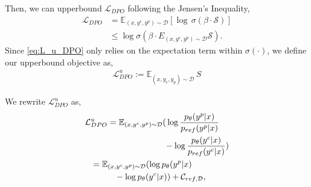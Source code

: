 \noindent Then, we can upperbound $\mathcal L_{DPO}$ following the Jensen's Inequality,
%
\begin{align}
  \mathcal L_{DPO}  &= \mathbb  E_{(x,y^c,y^p)\sim \mathcal D} [ \log \,\sigma( \beta \cdot \mathcal S)] \\
  &\leq \log\sigma(\beta \cdot E_{(x,y^c,y^p)\sim \mathcal D} \mathcal S). \label{eq:L_u_DPO}
\end{align}
%
Since \eqref{eq:L_u_DPO} only relies on the expectation term within $\sigma(\cdot)$, we define our upperbound objective as, %
%
\begin{align}
    \mathcal L^u_{DPO} := \mathbb E_{(x,y_c,y_p)\sim \mathcal D} \mathcal \,S 
\end{align}
%
%
%

\noindent We rewrite $ \mathcal L^u_{DPO}$ as,
%
\begin{align}
         \mathcal L&^u_{DPO} = \mathbb E_{(x,y^c,y^p)\sim \mathcal D} ( \,\log \frac{p_{\theta}(y^p|x)}{p_{ref}(y^p|x)} \notag\\
    &\,\,\,\,\,\,\,\,\,\,\,\,\,\,\,\,\,\,\,\,\,\,\,\,\,\,\,\,\,\,\,\,\,\,\,\,\,\,\,\,\,\,\,\,\,\,\,\,\,\,\,\,-\log \frac{p_{\theta}(y^c|x)}{p_{ref}(y^c|x)}) \\
    &=\mathbb E_{(x,y^c,y^p)\sim \mathcal D} (\log p_{\theta}(y^p|x) \notag\\
    &\,\,\,\,\,\,\,\,\,\,\,\,\,\,\,\,\,- \log p_{\theta}(y^c|x)) + \mathcal C_{ref,\mathcal D}, \label{eq:L_u_DPO_1}
\end{align}

